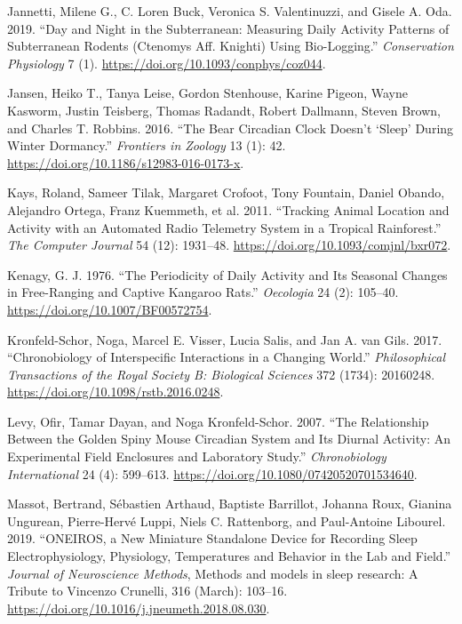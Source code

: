 \documentclass[msc,numbers,hidelinks]{coppe}
\newlength{\cslhangindent}
\newenvironment{cslreferences}%
  {\setlength{\parindent}{0pt}%
  \everypar{\setlength{\hangindent}{\cslhangindent}}\ignorespaces}%
  {\par}
\begin{document}
\begin{cslreferences}
  \leavevmode\hypertarget{ref-jannettiDayNightSubterranean2019}{}%
  Jannetti, Milene G., C. Loren Buck, Veronica S. Valentinuzzi, and Gisele A. Oda. 2019. ``Day and Night in the Subterranean: Measuring Daily Activity Patterns of Subterranean Rodents (Ctenomys Aff. Knighti) Using Bio-Logging.'' \emph{Conservation Physiology} 7 (1). \url{https://doi.org/10.1093/conphys/coz044}.

  \leavevmode\hypertarget{ref-jansenBearCircadianClock2016}{}%
  Jansen, Heiko T., Tanya Leise, Gordon Stenhouse, Karine Pigeon, Wayne Kasworm, Justin Teisberg, Thomas Radandt, Robert Dallmann, Steven Brown, and Charles T. Robbins. 2016. ``The Bear Circadian Clock Doesn't `Sleep' During Winter Dormancy.'' \emph{Frontiers in Zoology} 13 (1): 42. \url{https://doi.org/10.1186/s12983-016-0173-x}.

  \leavevmode\hypertarget{ref-kaysTrackingAnimalLocation2011}{}%
  Kays, Roland, Sameer Tilak, Margaret Crofoot, Tony Fountain, Daniel Obando, Alejandro Ortega, Franz Kuemmeth, et al. 2011. ``Tracking Animal Location and Activity with an Automated Radio Telemetry System in a Tropical Rainforest.'' \emph{The Computer Journal} 54 (12): 1931--48. \url{https://doi.org/10.1093/comjnl/bxr072}.

  \leavevmode\hypertarget{ref-kenagyPeriodicityDailyActivity1976}{}%
  Kenagy, G. J. 1976. ``The Periodicity of Daily Activity and Its Seasonal Changes in Free-Ranging and Captive Kangaroo Rats.'' \emph{Oecologia} 24 (2): 105--40. \url{https://doi.org/10.1007/BF00572754}.

  \leavevmode\hypertarget{ref-kronfeld-schorChronobiologyInterspecificInteractions2017}{}%
  Kronfeld-Schor, Noga, Marcel E. Visser, Lucia Salis, and Jan A. van Gils. 2017. ``Chronobiology of Interspecific Interactions in a Changing World.'' \emph{Philosophical Transactions of the Royal Society B: Biological Sciences} 372 (1734): 20160248. \url{https://doi.org/10.1098/rstb.2016.0248}.

  \leavevmode\hypertarget{ref-levyRelationshipGoldenSpiny2007}{}%
  Levy, Ofir, Tamar Dayan, and Noga Kronfeld-Schor. 2007. ``The Relationship Between the Golden Spiny Mouse Circadian System and Its Diurnal Activity: An Experimental Field Enclosures and Laboratory Study.'' \emph{Chronobiology International} 24 (4): 599--613. \url{https://doi.org/10.1080/07420520701534640}.

  \leavevmode\hypertarget{ref-massotONEIROSNewMiniature2019}{}%
  Massot, Bertrand, Sébastien Arthaud, Baptiste Barrillot, Johanna Roux, Gianina Ungurean, Pierre-Hervé Luppi, Niels C. Rattenborg, and Paul-Antoine Libourel. 2019. ``ONEIROS, a New Miniature Standalone Device for Recording Sleep Electrophysiology, Physiology, Temperatures and Behavior in the Lab and Field.'' \emph{Journal of Neuroscience Methods}, Methods and models in sleep research: A Tribute to Vincenzo Crunelli, 316 (March): 103--16. \url{https://doi.org/10.1016/j.jneumeth.2018.08.030}.


\end{cslreferences}
\end{document}
